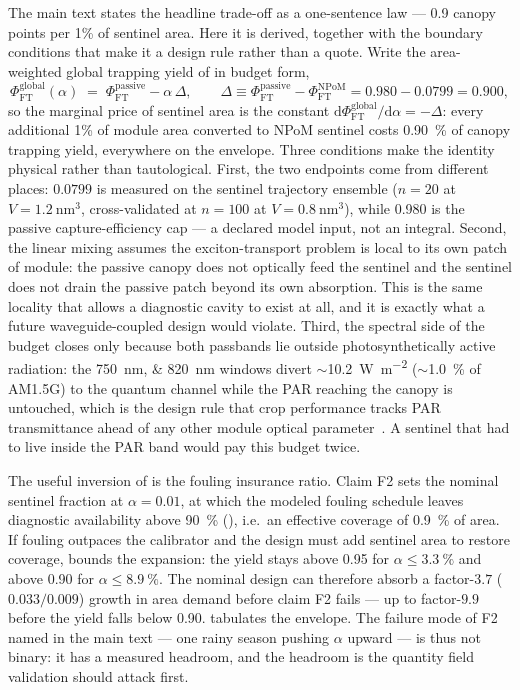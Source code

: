 \documentclass[11pt,a4paper]{article}
\begin{document}
The main text states the headline trade-off as a one-sentence law --- 0.9 canopy points per 1\% of sentinel area. Here it is derived, together with the boundary conditions that make it a design rule rather than a quote. Write the area-weighted global trapping yield of  in budget form,
\begin{equation}\label{SI-eq:budget_law}
\Phi_{\mathrm{FT}}^{\mathrm{global}}(\alpha) \;=\; \Phi_{\mathrm{FT}}^{\mathrm{passive}} - \alpha\,\Delta,
\qquad \Delta \equiv \Phi_{\mathrm{FT}}^{\mathrm{passive}} - \Phi_{\mathrm{FT}}^{\mathrm{NPoM}} = \num{0.980} - \num{0.0799} = \num{0.900},
\end{equation}
so the marginal price of sentinel area is the constant $\mathrm{d}\Phi_{\mathrm{FT}}^{\mathrm{global}}/\mathrm{d}\alpha = -\Delta$: every additional 1\% of module area converted to NPoM sentinel costs \qty{0.90}{\percent} of canopy trapping yield, everywhere on the envelope. Three conditions make the identity physical rather than tautological. First, the two endpoints come from different places: $\num{0.0799}$ is measured on the sentinel trajectory ensemble ($n=20$ at $V=\qty{1.2}{\nm\cubed}$, cross-validated at $n=100$ at $V=\qty{0.8}{\nm\cubed}$), while \num{0.980} is the passive capture-efficiency cap --- a declared model input, not an integral. Second, the linear mixing assumes the exciton-transport problem is local to its own patch of module: the passive canopy does not optically feed the sentinel and the sentinel does not drain the passive patch beyond its own absorption. This is the same locality that allows a diagnostic cavity to exist at all, and it is exactly what a future waveguide-coupled design would violate. Third, the spectral side of the budget closes only because both passbands lie outside photosynthetically active radiation: the \qtylist{750;820}{\nm} windows divert $\sim$\qty{10.2}{\W\per\m\squared} ($\sim$\qty{1.0}{\percent} of AM1.5G) to the quantum channel while the PAR reaching the canopy is untouched, which is the design rule that crop performance tracks PAR transmittance ahead of any other module optical parameter~\cite{Stallknecht2023}. A sentinel that had to live inside the PAR band would pay this budget twice.

The useful inversion of  is the fouling insurance ratio. Claim F2 sets the nominal sentinel fraction at $\alpha=\num{0.01}$, at which the modeled fouling schedule leaves diagnostic availability above \qty{90}{\percent} (), i.e.\ an effective coverage of \SI{0.9}{\percent} of area. If fouling outpaces the calibrator and the design must add sentinel area to restore coverage,  bounds the expansion: the yield stays above \num{0.95} for $\alpha \leq \qty{3.3}{\percent}$ and above \num{0.90} for $\alpha \leq \qty{8.9}{\percent}$. The nominal design can therefore absorb a factor-$\num{3.7}$ ($\num{0.033}/\num{0.009}$) growth in area demand before claim F2 fails --- up to factor-\(9.9\) before the yield falls below 0.90.  tabulates the envelope. The failure mode of F2 named in the main text --- one rainy season pushing $\alpha$ upward --- is thus not binary: it has a measured headroom, and the headroom is the quantity field validation should attack first.
\end{document}
